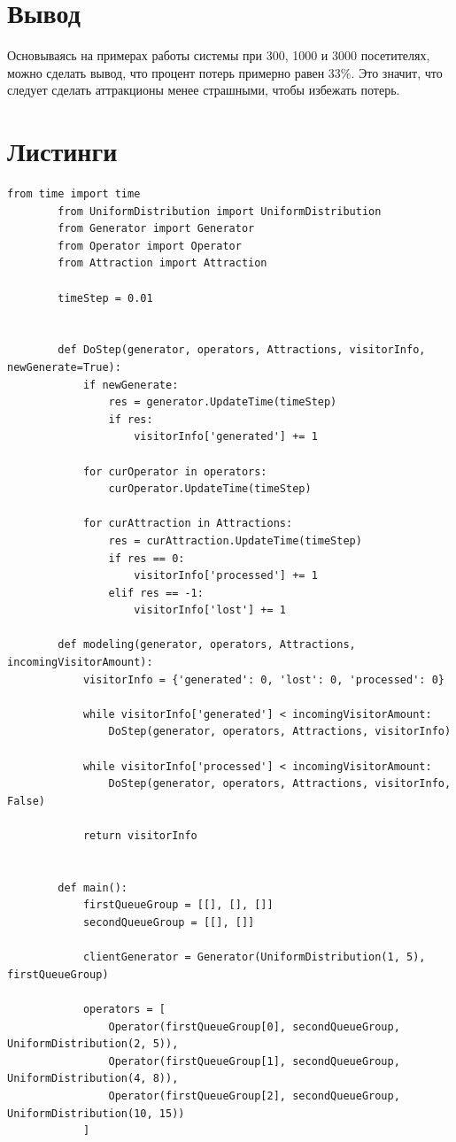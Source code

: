 \documentclass[14pt, a4paper]{extarticle}
\begin{document}
	\section*{Вывод}
	Основываясь на примерах работы системы при 300, 1000 и 3000 посетителях, можно сделать вывод, что процент потерь 
	примерно равен 33\%. Это значит, что следует сделать аттракционы менее страшными, чтобы избежать потерь.
	
	
	\clearpage
	\section*{Листинги}
	
	\begin{lstlisting}[caption=main.py]
		from time import time
		from UniformDistribution import UniformDistribution
		from Generator import Generator
		from Operator import Operator
		from Attraction import Attraction
		
		timeStep = 0.01
		
		
		def DoStep(generator, operators, Attractions, visitorInfo, newGenerate=True):
			if newGenerate:
				res = generator.UpdateTime(timeStep)
				if res:       
					visitorInfo['generated'] += 1
			
			for curOperator in operators:
				curOperator.UpdateTime(timeStep)
			
			for curAttraction in Attractions:
				res = curAttraction.UpdateTime(timeStep)
				if res == 0:
					visitorInfo['processed'] += 1
				elif res == -1:
					visitorInfo['lost'] += 1
		
		def modeling(generator, operators, Attractions, incomingVisitorAmount):
			visitorInfo = {'generated': 0, 'lost': 0, 'processed': 0}
			
			while visitorInfo['generated'] < incomingVisitorAmount:
				DoStep(generator, operators, Attractions, visitorInfo)
			
			while visitorInfo['processed'] < incomingVisitorAmount:
				DoStep(generator, operators, Attractions, visitorInfo, False)
			
			return visitorInfo
		
		
		def main():
			firstQueueGroup = [[], [], []]
			secondQueueGroup = [[], []]
			
			clientGenerator = Generator(UniformDistribution(1, 5), firstQueueGroup)
			
			operators = [
				Operator(firstQueueGroup[0], secondQueueGroup, UniformDistribution(2, 5)),    
				Operator(firstQueueGroup[1], secondQueueGroup, UniformDistribution(4, 8)),
				Operator(firstQueueGroup[2], secondQueueGroup, UniformDistribution(10, 15))    
			]
			

\end{lstlisting}
\end{document}
